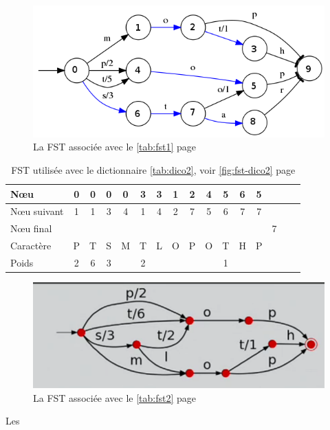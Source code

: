 \begin{figure}[ht]
    \centering
    \includegraphics[scale=0.5]{../c_asm/1.png}
    \caption{La FST associée avec le \autoref{tab:fst1} page \pageref{tab:fst1}}
    \label{fig:fst-dico1}
\end{figure}

\begin{table}[ht]
    \centering
    \begin{tabular}{|l||c|c|c|c|c|c|c|c|c|c|c|c|c|c|c|}
        \hline
        N\oe u & 0 & 0 & 0 & 0 & 3 & 3 & 1 & 2 & 4 & 5 & 6 & 5 &\\ \hline
        N\oe u suivant & 1 & 1 & 3 & 4 & 1 & 4 & 2 & 7 & 5 & 6 & 7 & 7 &\\ \hline
        N\oe u final &&&&&&&&&&&&& 7 \\ \hline
        Caractère & P & T & S & M& T & L & O & P & O & T & H & P & \\ \hline
        Poids & 2 & 6 & 3 &  & 2 & & & & & 1 &&& \\ \hline
    \end{tabular}
    \caption{FST utilisée avec le dictionnaire \autoref{tab:dico2}, voir \autoref{fig:fst-dico2} page \pageref{fig:fst-dico2}}
    \label{tab:fst2}
\end{table}

\begin{figure}[!htb]
    \centering
    \includegraphics[scale=0.5]{../c_asm/2.png}
    \caption{La FST associée avec le \autoref{tab:fst2} page \pageref{tab:fst2}}
    \label{fig:fst-dico2}
\end{figure}
Les
\clearpage
